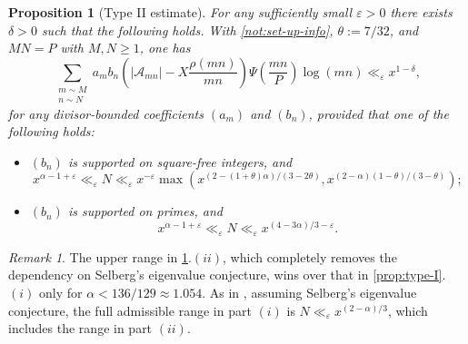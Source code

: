 \documentclass[reqno,11pt]{amsart}
\newtheorem{proposition}[theorem]{Proposition}
\theoremstyle{remark}
\newtheorem*{remark}{Remark}
\numberwithin{equation}{section}
\newcommand{\mA}{\mathcal{A}}
\newcommand{\eps}{\varepsilon}
\begin{document}
\begin{proposition}[Type II estimate] \label{prop:type-II}
For any sufficiently small $\eps > 0$ there exists $\delta > 0$ such that the following holds. With \cref{not:set-up-info}, $\theta := 7/32$, and $MN = P$ with $M, N \ge 1$, one has
\begin{equation}\label{eq:type-II}
    \sum_{\substack{m \sim M \\ n \sim N}} a_m b_n \left(|\mA_{mn}| - X \frac{\rho(mn)}{mn}\right) \Psi\left(\frac{mn}{P}\right) \log (mn) 
    \ll_\eps 
    x^{1-\delta},
\end{equation}
for any divisor-bounded coefficients $(a_m)$ and $(b_n)$, provided that one of the following holds: 
\begin{itemize} 
    \item[$(i)$.] $(b_n)$ is supported on square-free integers, and
    \begin{equation} \label{eq:type-II-ranges-1}
        x^{\alpha-1+\eps} \ll_\eps N \ll_\eps x^{-\eps}
        \max \left(x^{(2-(1+\theta)\alpha)/(3-2\theta)}, x^{(2-\alpha)(1-\theta)/(3-\theta)}\right);
    \end{equation}
    \item[$(ii)$.] $(b_n)$ is supported on primes, and
    \begin{equation} \label{eq:type-II-ranges-2}
        x^{\alpha-1+\eps} \ll_\eps N \ll_\eps
        x^{(4-3\alpha)/3 - \eps}.
    \end{equation}
\end{itemize}
\end{proposition} 

\begin{remark}
The upper range in \cref{prop:type-II}.$(ii)$, which completely removes the dependency on Selberg's eigenvalue conjecture, wins over that in \cref{prop:type-I}.$(i)$ only for $\alpha < 136/129 \approx 1.054$. As in \cite{merikoski2023largest}, assuming Selberg's eigenvalue conjecture, the full admissible range in part $(i)$ is $N \ll_\eps x^{(2-\alpha)/3}$, which includes the range in part $(ii)$.
\end{remark}
\end{document}
